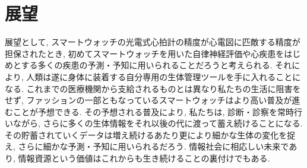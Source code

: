 \documentclass[report, 11pt, a4paper]{jsbook}
\begin{document}
\section{展望}
展望として, スマートウォッチの光電式心拍計の精度が心電図に匹敵する精度が担保されたとき, 初めてスマートウォッチを用いた自律神経評価や心疾患をはじめとする多くの疾患の予測・予知に用いられることだろうと考えられる. それにより, 人類は遂に身体に装着する自分専用の生体管理ツールを手に入れることになる. これまでの医療機関から支給されるものとは異なり私たちの生活に阻害をせず, ファッションの一部ともなっているスマートウォッチはより高い普及が進むことが予想できる. その予想される普及により, 私たちは, 診断・診察を常時行いながら, さらに多くの生体情報をそれ以後の代に渡って蓄え続けることになる. その貯蓄されていくデータは増え続けるあたり更により細かな生体の変化を捉え, さらに細かな予測・予知に用いられるだろう. 情報社会に相応しい未来であり, 情報資源という価値はこれからも生き続けることの裏付けでもある. \\
\end{document}
